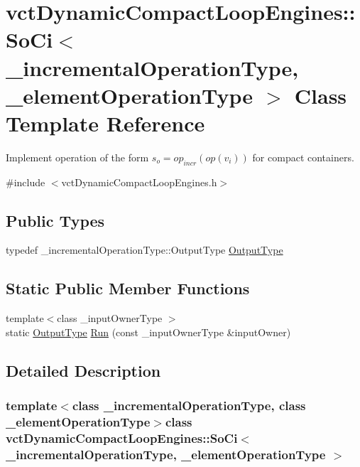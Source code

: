 \hypertarget{classvct_dynamic_compact_loop_engines_1_1_so_ci}{}\section{vct\+Dynamic\+Compact\+Loop\+Engines\+:\+:So\+Ci$<$ \+\_\+incremental\+Operation\+Type, \+\_\+element\+Operation\+Type $>$ Class Template Reference}
\label{classvct_dynamic_compact_loop_engines_1_1_so_ci}


Implement operation of the form $s_o = op_{incr}(op(v_i))$ for compact containers.  




{\ttfamily \#include $<$vct\+Dynamic\+Compact\+Loop\+Engines.\+h$>$}

\subsection*{Public Types}
\begin{DoxyCompactItemize}
\item 
typedef \+\_\+incremental\+Operation\+Type\+::\+Output\+Type \hyperlink{classvct_dynamic_compact_loop_engines_1_1_so_ci_a85a6c1ae9a5df9099423b58d318280b4}{Output\+Type}
\end{DoxyCompactItemize}
\subsection*{Static Public Member Functions}
\begin{DoxyCompactItemize}
\item 
{\footnotesize template$<$class \+\_\+input\+Owner\+Type $>$ }\\static \hyperlink{classvct_dynamic_compact_loop_engines_1_1_so_ci_a85a6c1ae9a5df9099423b58d318280b4}{Output\+Type} \hyperlink{classvct_dynamic_compact_loop_engines_1_1_so_ci_aab14f62a74be913a13551e575122ca91}{Run} (const \+\_\+input\+Owner\+Type \&input\+Owner)
\end{DoxyCompactItemize}


\subsection{Detailed Description}
\subsubsection*{template$<$class \+\_\+incremental\+Operation\+Type, class \+\_\+element\+Operation\+Type$>$class vct\+Dynamic\+Compact\+Loop\+Engines\+::\+So\+Ci$<$ \+\_\+incremental\+Operation\+Type, \+\_\+element\+Operation\+Type $>$}

